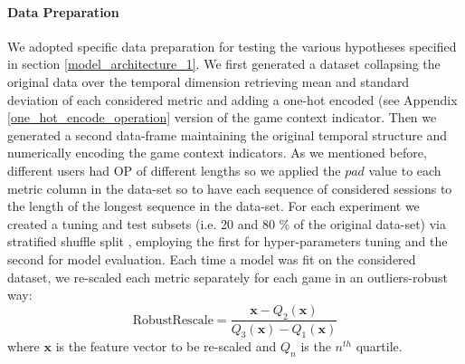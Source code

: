 

\paragraph*{Data Preparation}
\label{data_preparation_1}
We adopted specific data preparation for testing the various hypotheses specified in section \ref{model_architecture_1}. We first generated a dataset collapsing the original data over the temporal dimension retrieving mean and standard deviation of each considered metric and adding a one-hot encoded (see Appendix \ref{one_hot_encode_operation} version of the game context indicator. Then we generated a second data-frame maintaining the original temporal structure and numerically encoding the game context indicators. As we mentioned before, different users had OP of different lengths so we applied the $pad$ value to each metric column in the data-set so to have each sequence of considered sessions to the length of the longest sequence in the data-set. For each experiment we created a tuning and test subsets (i.e. 20 and 80 \% of the original data-set) via stratified shuffle split \cite{scikit-learn}, employing the first for hyper-parameters tuning and the second for model evaluation. Each time a model was fit on the considered dataset, we re-scaled each metric separately for each game in an outliers-robust way:
\begin{equation}
\label{robustscaler}
    \text{RobustRescale}=
        \dfrac
            {\mathbf{x} - Q_2(\mathbf{x})}
            {Q_3(\mathbf{x}) - Q_1(\mathbf{x})}
\end{equation}
where $\mathbf{x}$ is the feature vector to be re-scaled and $Q_n$ is the $n^{th}$ quartile. 

